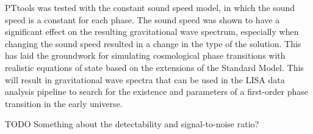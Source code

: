 PTtools was tested with the constant sound speed model, in which the sound speed is a constant for each phase.
The sound speed was shown to have a significant effect on the resulting gravitational wave spectrum,
especially when changing the sound speed resulted in a change in the type of the solution.
This has laid the groundwork for simulating cosmological phase transitions with realistic equations of state based on the extensions of the Standard Model.
This will result in gravitational wave spectra that can be used in the LISA data analysis pipeline to search for the existence and parameters of a first-order phase transition in the early universe.

TODO Something about the detectability and signal-to-noise ratio?
\fi
